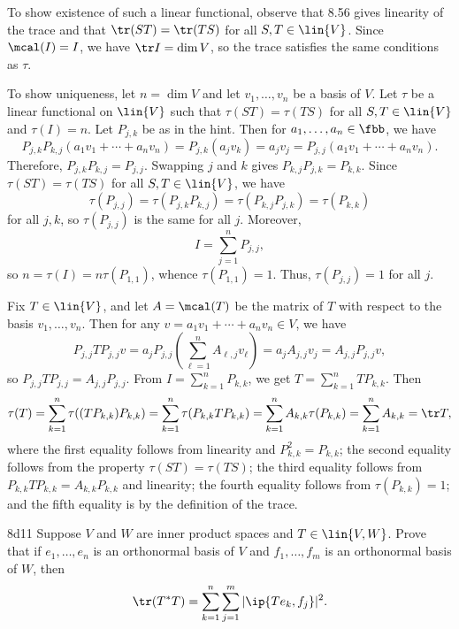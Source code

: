 \begin{sol}
    To show existence of such a linear functional, observe that 8.56 gives linearity of the trace and that $\tr(ST) = \tr(TS)$ for all $S, T \in \lin{V}$.
    Since $\mcal(I) = I$, we have $\tr I = \dim V$, so the trace satisfies the same conditions as $\tau$.
    
    To show uniqueness, let $n = \dim V$ and let $v_1, \ldots, v_n$ be a basis of $V$.
    Let $\tau$ be a linear functional on $\lin{V}$ such that $\tau(ST) = \tau(TS)$ for all $S, T \in \lin{V}$ and $\tau(I) = n$.
    Let $P_{j,k}$ be as in the hint.
    Then for $a_1, \ldots, a_n \in \fbb$, we have
    \[
        P_{j,k} P_{k,j}(a_1 v_1 + \cdots + a_n v_n) = P_{j, k}(a_j v_k) = a_j v_j = P_{j,j}(a_1 v_1 + \cdots + a_n v_n).
    \]
    Therefore, $P_{j,k} P_{k,j} = P_{j,j}$.
    Swapping $j$ and $k$ gives $P_{k,j} P_{j,k} = P_{k,k}$.
    Since $\tau(ST) = \tau(TS)$ for all $S, T \in \lin{V}$, we have
    \[
        \tau(P_{j,j}) = \tau(P_{j,k} P_{k,j}) = \tau(P_{k,j} P_{j,k}) = \tau(P_{k,k})
    \]
    for all $j, k$, so $\tau(P_{j,j})$ is the same for all $j$.
    Moreover,
    \[
        I = \sum_{j=1}^{n} P_{j,j},
    \]
    so $n = \tau(I) = n \tau(P_{1,1})$, whence $\tau(P_{1,1}) = 1$.
    Thus, $\tau(P_{j,j}) = 1$ for all $j$.

    Fix $T \in \lin{V}$, and let $A = \mcal(T)$ be the matrix of $T$ with respect to the basis $v_1, \ldots, v_n$.
    Then for any $v = a_1 v_1 + \cdots + a_n v_n \in V$, we have
    \[
        P_{j,j} TP_{j, j} v = a_j P_{j,j} \left(\sum_{\ell=1}^{n} A_{\ell,j} v_\ell \right) = a_j A_{j,j} v_j = A_{j,j} P_{j,j} v,
    \]
    so $P_{j,j} T P_{j,j} = A_{j,j} P_{j,j}$.
    From $I = \sum_{k=1}^n P_{k,k}$, we get $T = \sum_{k=1}^n T P_{k,k}$.
    Then
    \[
        \tau(T) = \sum_{k=1}^n \tau((T P_{k,k}) P_{k,k}) = \sum_{k=1}^n \tau(P_{k,k} T P_{k,k}) = \sum_{k=1}^n A_{k,k} \tau(P_{k,k}) = \sum_{k=1}^n A_{k,k} = \tr T,
    \]
    where the first equality follows from linearity and $P_{k,k}^2 = P_{k,k}$;
    the second equality follows from the property $\tau(ST) = \tau(TS)$;
    the third equality follows from $P_{k,k} T P_{k,k} = A_{k,k} P_{k,k}$ and linearity;
    the fourth equality follows from $\tau(P_{k,k}) = 1$;
    and the fifth equality is by the definition of the trace.
\end{sol}

\begin{exercise}{8d11}
    Suppose $V$ and $W$ are inner product spaces and $T \in \lin{V, W}$.
    Prove that if $e_1, \ldots, e_n$ is an orthonormal basis of $V$ and $f_1, \ldots, f_m$ is an orthonormal basis of $W$, then
    \[
        \tr(T^\ast T) = \sum_{k=1}^{n} \sum_{j=1}^{m} |\ip{Te_k, f_j}|^2.
    \]

\end{exercise}

